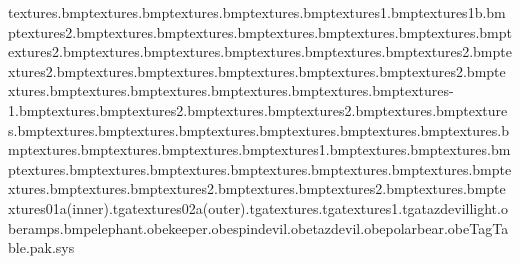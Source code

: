 textures\anvilbuttons.bmp textures\anvilcannister.bmp textures\anvileye.bmp textures\anvilfingers.bmp textures\anvilgun1.bmp textures\anvilgun1b.bmp textures\anvilgun2.bmp textures\anvillogo.bmp textures\anvilshoulder.bmp textures\anvilstrap.bmp textures\anviltache.bmp textures\bodyeyebrow.bmp textures\bodytoes2.bmp textures\catchercollarl.bmp textures\catchercollarr.bmp textures\catchereye.bmp textures\catcherhat.bmp textures\daffynostril2.bmp textures\earslined2.bmp textures\elephanteye.bmp textures\elephanttoes.bmp textures\elephantwrinkles.bmp textures\eyetex.bmp textures\eyetex2.bmp textures\eyetextweety.bmp textures\fuddcap.bmp textures\fuddmike.bmp textures\fuddshoe.bmp textures\fuddstripes.bmp textures\fuddwhistlebit-1.bmp textures\gossfinger.bmp textures\gossshoe2.bmp textures\hammerlogo.bmp textures\keeperbutton2.bmp textures\keepercollar.bmp textures\keepereye.bmp textures\keeperfingers.bmp textures\keeperhat.bmp textures\keepertache.bmp textures\muzzlestubble.bmp textures\noseshine.bmp textures\pbeye.bmp textures\pbmouth.bmp textures\pbnose.bmp textures\pbteeth.bmp textures\shedevilbracelet1.bmp textures\sylvesterfuredge.bmp textures\taskforcebelt.bmp textures\taskforcecollar.bmp textures\taskforcecuffs.bmp textures\tazforceshield.bmp textures\tsamankles.bmp textures\tsambutton.bmp textures\tsamcollar.bmp textures\tsamteeth.bmp textures\tsamtie.bmp textures\tweetybrow2.bmp textures\wileeeyeball.bmp textures\wileenosebridge2.bmp textures\ramps.bmp textures\spin01a(inner).tga textures\spin02a(outer).tga textures\taskforcegloveextend.tga textures\taskforcevisor1.tga tazdevillight.obe ramps.bmp elephant.obe keeper.obe spindevil.obe tazdevil.obe polarbear.obe TagTable.pak.sys 